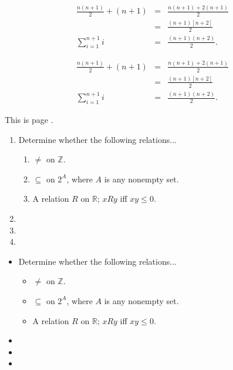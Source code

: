 \documentclass[12pt]{article} %
\begin{document}
\begin{eqnarray}
\frac{n(n+1)}{2}+(n+1)&=&\frac{n(n+1)+2(n+1)}{2}\\
&=&\frac{(n+1)[n+2]}{2}\\
\sum_{i=1}^{n+1}{i}&=&\frac{(n+1)(n+2)}{2}.
\end{eqnarray}

\begin{eqnarray*}
\frac{n(n+1)}{2}+(n+1)&=&\frac{n(n+1)+2(n+1)}{2}\\
&=&\frac{(n+1)[n+2]}{2}\\
\sum_{i=1}^{n+1}{i}&=&\frac{(n+1)(n+2)}{2}.
\end{eqnarray*}

This is page \thepage.

\begin{enumerate}
\item Determine whether the following relations...
\begin{enumerate}
\item $\neq$ on $\mathbb Z$.
\item $\subseteq$ on $2^A$, where $A$ is any nonempty set.
\item A relation $R$ on $\mathbb R$; $x R y$ iff $xy\leq 0$.
\end{enumerate}

\item
\item
\item
\end{enumerate}

\begin{itemize}
\item Determine whether the following relations...
\begin{itemize}
\item $\neq$ on $\mathbb Z$.
\item $\subseteq$ on $2^A$, where $A$ is any nonempty set.
\item A relation $R$ on $\mathbb R$; $x R y$ iff $xy\leq 0$.
\end{itemize}

\item
\item
\item
\end{itemize}
\end{document}
